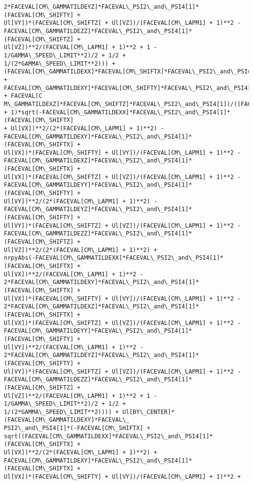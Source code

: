 \documentclass[landscape,letterpaper,10pt,english]{article}
\begin{document}
\begin{Verbatim}[commandchars=\\\{\}]
2*FACEVAL[CM\_GAMMATILDEYZ]*FACEVAL\_PSI2\_and\_PSI4[1]*(FACEVAL[CM\_SHIFTY] +
Ul[VY])*(FACEVAL[CM\_SHIFTZ] + Ul[VZ])/(FACEVAL[CM\_LAPM1] + 1)**2 -
FACEVAL[CM\_GAMMATILDEZZ]*FACEVAL\_PSI2\_and\_PSI4[1]*(FACEVAL[CM\_SHIFTZ] +
Ul[VZ])**2/(FACEVAL[CM\_LAPM1] + 1)**2 + 1 - 1/GAMMA\_SPEED\_LIMIT**2)/2 + 1/2 +
1/(2*GAMMA\_SPEED\_LIMIT**2))) +
(FACEVAL[CM\_GAMMATILDEXX]*FACEVAL[CM\_SHIFTX]*FACEVAL\_PSI2\_and\_PSI4[1] +
FACEVAL[CM\_GAMMATILDEXY]*FACEVAL[CM\_SHIFTY]*FACEVAL\_PSI2\_and\_PSI4[1] + FACEVAL[C
M\_GAMMATILDEXZ]*FACEVAL[CM\_SHIFTZ]*FACEVAL\_PSI2\_and\_PSI4[1])/((FACEVAL[CM\_LAPM1]
+ 1)*sqrt(-FACEVAL[CM\_GAMMATILDEXX]*FACEVAL\_PSI2\_and\_PSI4[1]*(FACEVAL[CM\_SHIFTX]
+ Ul[VX])**2/(2*(FACEVAL[CM\_LAPM1] + 1)**2) -
FACEVAL[CM\_GAMMATILDEXY]*FACEVAL\_PSI2\_and\_PSI4[1]*(FACEVAL[CM\_SHIFTX] +
Ul[VX])*(FACEVAL[CM\_SHIFTY] + Ul[VY])/(FACEVAL[CM\_LAPM1] + 1)**2 -
FACEVAL[CM\_GAMMATILDEXZ]*FACEVAL\_PSI2\_and\_PSI4[1]*(FACEVAL[CM\_SHIFTX] +
Ul[VX])*(FACEVAL[CM\_SHIFTZ] + Ul[VZ])/(FACEVAL[CM\_LAPM1] + 1)**2 -
FACEVAL[CM\_GAMMATILDEYY]*FACEVAL\_PSI2\_and\_PSI4[1]*(FACEVAL[CM\_SHIFTY] +
Ul[VY])**2/(2*(FACEVAL[CM\_LAPM1] + 1)**2) -
FACEVAL[CM\_GAMMATILDEYZ]*FACEVAL\_PSI2\_and\_PSI4[1]*(FACEVAL[CM\_SHIFTY] +
Ul[VY])*(FACEVAL[CM\_SHIFTZ] + Ul[VZ])/(FACEVAL[CM\_LAPM1] + 1)**2 -
FACEVAL[CM\_GAMMATILDEZZ]*FACEVAL\_PSI2\_and\_PSI4[1]*(FACEVAL[CM\_SHIFTZ] +
Ul[VZ])**2/(2*(FACEVAL[CM\_LAPM1] + 1)**2) +
nrpyAbs(-FACEVAL[CM\_GAMMATILDEXX]*FACEVAL\_PSI2\_and\_PSI4[1]*(FACEVAL[CM\_SHIFTX] +
Ul[VX])**2/(FACEVAL[CM\_LAPM1] + 1)**2 -
2*FACEVAL[CM\_GAMMATILDEXY]*FACEVAL\_PSI2\_and\_PSI4[1]*(FACEVAL[CM\_SHIFTX] +
Ul[VX])*(FACEVAL[CM\_SHIFTY] + Ul[VY])/(FACEVAL[CM\_LAPM1] + 1)**2 -
2*FACEVAL[CM\_GAMMATILDEXZ]*FACEVAL\_PSI2\_and\_PSI4[1]*(FACEVAL[CM\_SHIFTX] +
Ul[VX])*(FACEVAL[CM\_SHIFTZ] + Ul[VZ])/(FACEVAL[CM\_LAPM1] + 1)**2 -
FACEVAL[CM\_GAMMATILDEYY]*FACEVAL\_PSI2\_and\_PSI4[1]*(FACEVAL[CM\_SHIFTY] +
Ul[VY])**2/(FACEVAL[CM\_LAPM1] + 1)**2 -
2*FACEVAL[CM\_GAMMATILDEYZ]*FACEVAL\_PSI2\_and\_PSI4[1]*(FACEVAL[CM\_SHIFTY] +
Ul[VY])*(FACEVAL[CM\_SHIFTZ] + Ul[VZ])/(FACEVAL[CM\_LAPM1] + 1)**2 -
FACEVAL[CM\_GAMMATILDEZZ]*FACEVAL\_PSI2\_and\_PSI4[1]*(FACEVAL[CM\_SHIFTZ] +
Ul[VZ])**2/(FACEVAL[CM\_LAPM1] + 1)**2 + 1 - 1/GAMMA\_SPEED\_LIMIT**2)/2 + 1/2 +
1/(2*GAMMA\_SPEED\_LIMIT**2)))) + Ul[BY\_CENTER]*(FACEVAL[CM\_GAMMATILDEXY]*FACEVAL\_
PSI2\_and\_PSI4[1]*(-FACEVAL[CM\_SHIFTX] +
sqrt((FACEVAL[CM\_GAMMATILDEXX]*FACEVAL\_PSI2\_and\_PSI4[1]*(FACEVAL[CM\_SHIFTX] +
Ul[VX])**2/(2*(FACEVAL[CM\_LAPM1] + 1)**2) +
FACEVAL[CM\_GAMMATILDEXY]*FACEVAL\_PSI2\_and\_PSI4[1]*(FACEVAL[CM\_SHIFTX] +
Ul[VX])*(FACEVAL[CM\_SHIFTY] + Ul[VY])/(FACEVAL[CM\_LAPM1] + 1)**2 +

\end{Verbatim}
\end{document}
